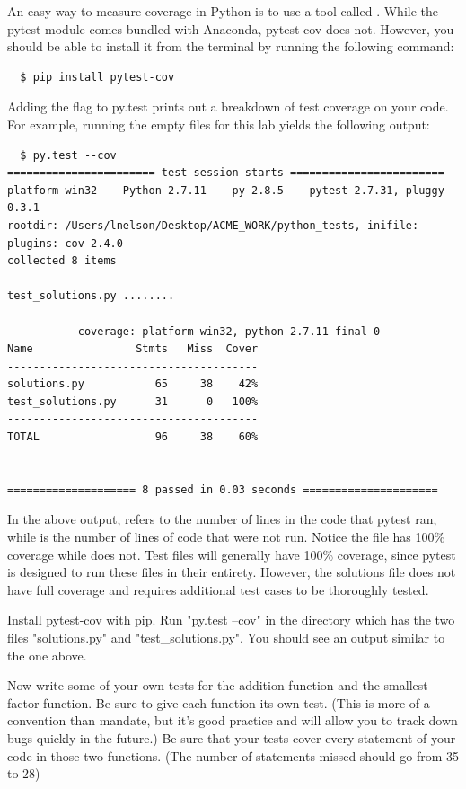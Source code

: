 An easy way to measure coverage in Python is to use a tool called  . While the pytest module comes bundled with Anaconda, pytest-cov does not.  However, you should be able to install it from the terminal by running the following command:
\begin{lstlisting}
  $ pip install pytest-cov
\end{lstlisting}
Adding the flag  to py.test prints out a breakdown of test coverage on your code. For example, running the empty files for this lab yields the following output:
\begin{lstlisting}
  $ py.test --cov
======================= test session starts ========================
platform win32 -- Python 2.7.11 -- py-2.8.5 -- pytest-2.7.31, pluggy-0.3.1
rootdir: /Users/lnelson/Desktop/ACME_WORK/python_tests, inifile:
plugins: cov-2.4.0
collected 8 items

test_solutions.py ........

---------- coverage: platform win32, python 2.7.11-final-0 -----------
Name                Stmts   Miss  Cover
---------------------------------------
solutions.py           65     38    42%
test_solutions.py      31      0   100%
---------------------------------------
TOTAL                  96     38    60%


==================== 8 passed in 0.03 seconds =====================
\end{lstlisting}

In the above output,  refers to the number of lines in the code that pytest ran, while  is the number of lines of code that were not run.
Notice the file  has 100\% coverage while  does not. Test files will generally have 100\% coverage, since pytest is designed to run these files in their entirety. However, the solutions file does not have full coverage and requires additional test cases to be thoroughly tested.

\begin{problem}
Install pytest-cov with pip.
Run "py.test --cov" in the directory which has the two files "solutions.py" and "test\_solutions.py". You should see an output similar to the one above.

Now write some of your own tests for the addition function and the smallest factor function. Be sure to give each function its own test. (This is more of a convention than mandate,
but it's good practice and will allow you to track down bugs quickly in the future.) Be sure that your tests cover every statement of your code in those two functions.
(The number of statements missed should go from 35 to 28)
\end{problem}

